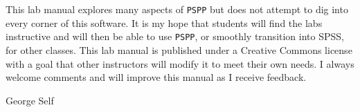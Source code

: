 This lab manual explores many aspects of \texttt{PSPP} but does not attempt to dig into every corner of this software. It is my hope that students will find the labs instructive and will then be able to use \texttt{PSPP}, or smoothly transition into SPSS, for other classes. This lab manual is published under a Creative Commons license with a goal that other instructors will modify it to meet their own needs. I always welcome comments and will improve this manual as I receive feedback.

\bigskip
\begin{flushright}
  \textemdash  George Self
\end{flushright}


